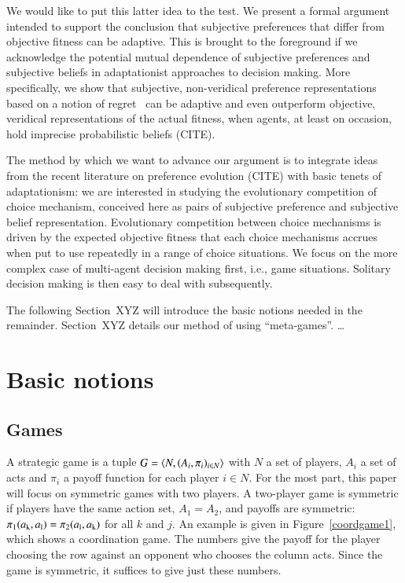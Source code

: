 \documentclass[fleqn,reqno,11pt]{article}
\begin{document}
We would like to put this latter idea to the test. We present a formal argument intended to
support the conclusion that subjective preferences that differ from objective fitness can be
adaptive. This is brought to the foreground if we acknowledge the potential mutual dependence
of subjective preferences and subjective beliefs in adaptationist approaches to decision
making. More specifically, we show that subjective, non-veridical preference representations
based on a notion of regret
\citep[e.g.][]{Savage1951:The-theory-of-s,LoomesSugden1982:Regret-Theory:-}\ can be adaptive and even outperform objective, veridical representations of the
actual fitness, when agents, at least on occasion, hold imprecise probabilistic beliefs
(CITE). 

The method by which we want to advance our argument is to integrate ideas from the recent
literature on preference evolution (CITE) with basic tenets of adaptationism: we are interested
in studying the evolutionary competition of choice mechanism, conceived here as pairs of
subjective preference and subjective belief representation. Evolutionary competition between
choice mechanisms is driven by the expected objective fitness that each choice mechanisms
accrues when put to use repeatedly in a range of choice situations. We focus on the more
complex case of multi-agent decision making first, i.e., game situations. Solitary decision
making is then easy to deal with subsequently.

The following Section~XYZ will introduce the basic notions needed in the remainder. Section~XYZ
details our method of using ``meta-games''. \dots


\section{Basic notions}
\label{sec:basic-notions}

\subsection{Games} \label{sec:games}

A strategic game is a tuple $ G=\left \langle  N, (A_i , \pi_i)_{i \in N} \right\rangle$ with $N$ a set of
players, $A_i$ a set of acts and $\pi_i$ a payoff function for each player $i \in N$. For the
most part, this paper will focus on symmetric games with two players. A two-player game is
symmetric if players have the same action set, $A_1 = A_2$, and payoffs are symmetric:
$\pi_1(a_{\text{k}}, a_{\text{l}}) = \pi_2(a_{\text{l}}, a_{\text{k}})$ for all $k$ and $j$. An example is
given in Figure~\ref{coordgame1}, which shows a coordination game. The numbers give the payoff
for the player choosing the row against an opponent who chooses the column acts. Since the game
is symmetric, it suffices to give just these numbers.
\end{document}
